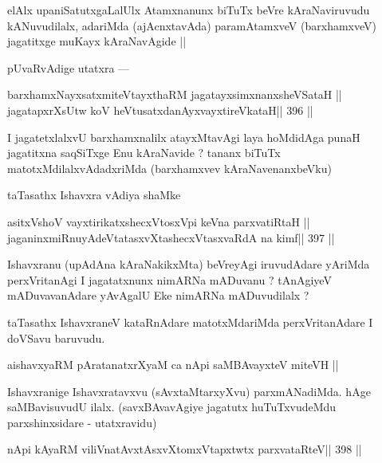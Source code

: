 \begin{artha}
elAlx upaniSatutxgaLalUlx Atamxnanunx biTuTx beVre kAraNaviruvudu kANuvudilalx, adariMda (ajAcnxtavAda) paramAtamxveV (barxhamxveV) jagatitxge muKayx kAraNavAgide ||
\end{artha}

\begin{artha}
pUvaRvAdige utatxra ---
\end{artha}

\begin{shl}
barxhamxNayxsatxmiteV\s tayxthaRM jagatayxsimxnanxsheVSataH ||
jagatapxrXsUtw koV heVtusatxdanAyxvayxtireVkataH\hfill || 396 ||
\end{shl}

\begin{artha}
I jagatetxlalxvU barxhamxnalilx atayxMtavAgi laya hoMdidAga punaH jagatitxna saqSiTxge Enu kAraNavide ? tananx biTuTx matotxMdilalxvAdadxriMda (barxhamxvev kAraNavenanxbeVku) 
\end{artha}

\begin{artha}
taTasathx Ishavxra vAdiya shaMke
\end{artha}

\begin{shl}
asitxVshoV vayxtirikatxshecxVtosxV\s pi keVna parxvatiRtaH ||
jaganinxmiRnuyAdeVtatasxvXtashecxVtasxvaRdA na kimf\hfill || 397 ||
\end{shl}

\begin{artha}
Ishavxranu (upAdAna kAraNakikxMta) beVreyAgi iruvudAdare yAriMda perxVritanAgi I jagatatxnunx nimARNa mADuvanu ? tAnAgiyeV mADuvavanAdare yAvAgalU Eke nimARNa mADuvudilalx ?
\end{artha}

\begin{artha}
taTasathx IshavxraneV kataRnAdare matotxMdariMda perxVritanAdare I doVSavu baruvudu.
\end{artha}

\begin{shl}
aishavxyaRM pAratanatxrXyaM ca nApi saMBAvayxteV miteVH ||
\end{shl}

\begin{artha}
Ishavxranige Ishavxratavxvu (sAvxtaMtarxyXvu) parxmANadiMda. hAge saMBavisuvudU ilalx. (savxBAvavAgiye jagatutx huTuTxvudeMdu parxshinxsidare - utatxravidu)
\end{artha}

\begin{shl}
nApi kAyaRM viliVnatAvxtAsxvXtomxVtapxtwtx parxvataRteV\hfill || 398 ||
\end{shl}

